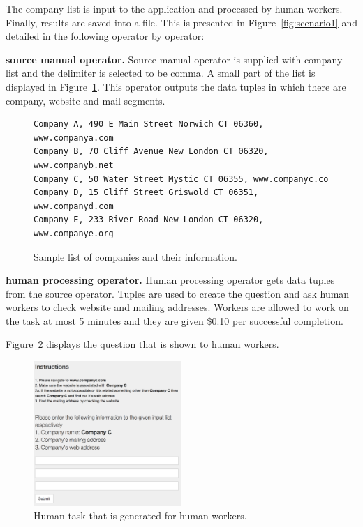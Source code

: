 The company list is input to the application and processed by human workers. Finally, results are saved into a file. This is presented in Figure~\ref{fig:scenario1} and detailed in the following operator by operator:

\textbf{source manual operator.}
Source manual operator is supplied with company list and the delimiter is selected to be comma. A small part of the list is displayed in Figure~\ref{fig:scenario1.list}. This operator outputs the data tuples in which there are company, website and mail segments.

\begin{figure}[ht]
	\centering
\begin{lstlisting}
Company A, 490 E Main Street Norwich CT 06360, www.companya.com
Company B, 70 Cliff Avenue New London CT 06320, www.companyb.net
Company C, 50 Water Street Mystic CT 06355, www.companyc.co
Company D, 15 Cliff Street Griswold CT 06351, www.companyd.com
Company E, 233 River Road New London CT 06320, www.companye.org
\end{lstlisting}
\caption{Sample list of companies and their information.}
	\label{fig:scenario1.list}
\end{figure}


\textbf{human processing operator.}
Human processing operator gets data tuples from the source operator. Tuples are used to create the question and ask human workers to check website and mailing addresses. Workers are allowed to work on the task at most 5 minutes and they are given \$0.10 per successful completion.

Figure~\ref{fig:scenario1.1h} displays the question that is shown to human workers.

\begin{figure}[ht]
	\centering
	\includegraphics[width=0.5\textwidth]{figures/scenarios/scenario1_1h.png}
	\caption{Human task that is generated for human workers.}
	\label{fig:scenario1.1h}
\end{figure}

